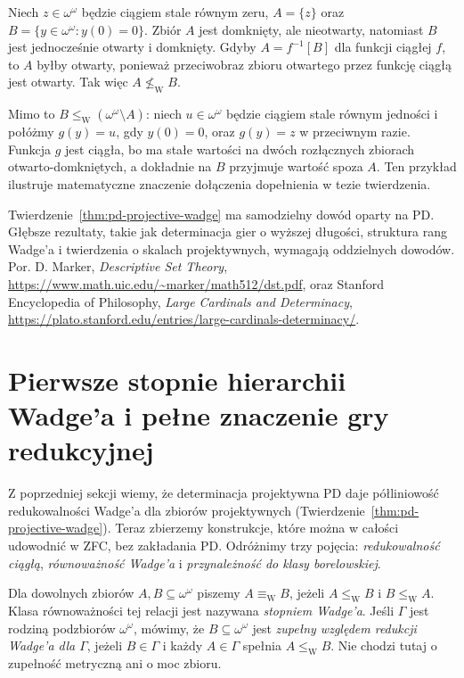 \begin{przyklad}
Niech $z\in\omega^\omega$ będzie ciągiem stale
równym zeru, $A=\{z\}$ oraz
$B=\{y\in\omega^\omega:y(0)=0\}$. Zbiór $A$
jest domknięty, ale nieotwarty, natomiast $B$
jest jednocześnie otwarty i domknięty. Gdyby
$A=f^{-1}[B]$ dla funkcji ciągłej $f$, to
$A$ byłby otwarty, ponieważ przeciwobraz zbioru
otwartego przez funkcję ciągłą jest otwarty.
Tak więc $A\not\leq_{\mathrm W}B$.

Mimo to $B\leq_{\mathrm W}(\omega^\omega\setminus A)$:
niech $u\in\omega^\omega$ będzie ciągiem stale
równym jedności i połóżmy $g(y)=u$, gdy
$y(0)=0$, oraz $g(y)=z$ w przeciwnym razie.
Funkcja $g$ jest ciągła, bo ma stałe wartości
na dwóch rozłącznych zbiorach otwarto-domkniętych,
a dokładnie na $B$ przyjmuje wartość spoza $A$.
Ten przykład ilustruje matematyczne znaczenie
dołączenia dopełnienia w tezie twierdzenia.
\end{przyklad}

\begin{uwaga}
Twierdzenie~\ref{thm:pd-projective-wadge}
ma samodzielny dowód oparty na PD. Głębsze
rezultaty, takie jak determinacja gier o wyższej
długości, struktura rang Wadge'a i twierdzenia
o skalach projektywnych, wymagają oddzielnych
dowodów. Por. D. Marker, \emph{Descriptive Set Theory},
\url{https://www.math.uic.edu/~marker/math512/dst.pdf},
oraz Stanford Encyclopedia of Philosophy,
\emph{Large Cardinals and Determinacy},
\url{https://plato.stanford.edu/entries/large-cardinals-determinacy/}.
\end{uwaga}


\section{Pierwsze stopnie hierarchii Wadge'a i pełne znaczenie gry redukcyjnej}
\label{sec:wadge-first-levels}
Z poprzedniej sekcji wiemy, że determinacja projektywna
PD daje półliniowość redukowalności Wadge'a dla zbiorów
projektywnych (Twierdzenie~\ref{thm:pd-projective-wadge}).
Teraz zbierzemy konstrukcje, które można w całości
udowodnić w ZFC, bez zakładania PD. Odróżnimy trzy
pojęcia: \emph{redukowalność ciągłą}, \emph{równoważność
Wadge'a} i \emph{przynależność do klasy borelowskiej}.

\begin{definicja}
\label{def:wadge-equivalence-completeness}
Dla dowolnych zbiorów $A,B\subseteq\omega^\omega$
piszemy $A\equiv_{\mathrm W}B$, jeżeli
$A\leq_{\mathrm W}B$ i $B\leq_{\mathrm W}A$.
Klasa równoważności tej relacji jest nazywana
\emph{stopniem Wadge'a}. Jeśli $\Gamma$ jest
rodziną podzbiorów $\omega^\omega$, mówimy, że
$B\subseteq\omega^\omega$ jest \emph{zupełny
względem redukcji Wadge'a dla $\Gamma$}, jeżeli
$B\in\Gamma$ i każdy $A\in\Gamma$ spełnia
$A\leq_{\mathrm W}B$. Nie chodzi tutaj o
zupełność metryczną ani o moc zbioru.
\end{definicja}


